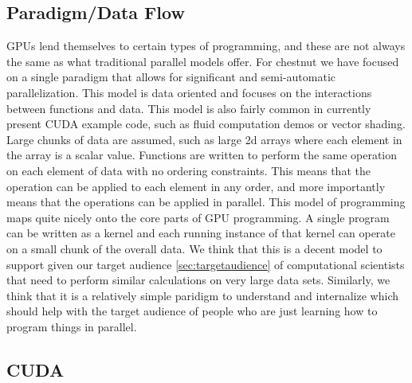 \documentclass[twocolumn]{article}
\renewcommand{\|}{\origbar} %
\begin{document}
\subsection{Paradigm/Data Flow}

GPUs lend themselves to certain types of programming, and these are not always the same as what traditional parallel models offer. For chestnut we have focused on a single paradigm that allows for significant and semi-automatic parallelization. This model is data oriented and focuses on the interactions between functions and data. This model is also fairly common in currently present CUDA example code, such as fluid computation demos or vector shading. Large chunks of data are assumed, such as large 2d arrays where each element in the array is a scalar value. Functions are written to perform the same operation on each element of data with no ordering constraints. This means that the operation can be applied to each element in any order, and more importantly means that the operations can be applied in parallel. This model of programming maps quite nicely onto the core parts of GPU programming. A single program can be written as a kernel and each running instance of that kernel can operate on a small chunk of the overall data. We think that this is a decent model to support given our target audience \ref{sec:targetaudience} of computational scientists that need to perform similar calculations on very large data sets. Similarly, we think that it is a relatively simple paridigm to understand and internalize which should help with the target audience of people who are just learning how to program things in parallel.

\subsection{CUDA}
\label{sec:CUDA}
\end{document}

